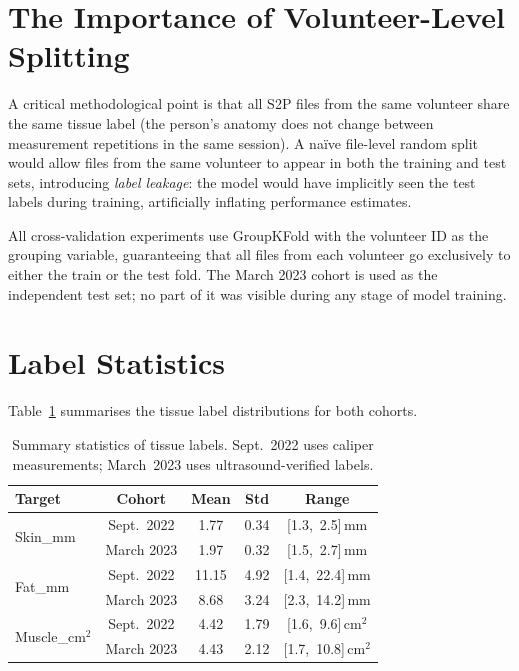 \documentclass[12pt, a4paper, oneside]{report}
\begin{document}
\section{The Importance of Volunteer-Level Splitting}

A critical methodological point is that all S2P files from the same volunteer share the same tissue label (the person's anatomy does not change between measurement repetitions in the same session). A na\"{i}ve file-level random split would allow files from the same volunteer to appear in both the training and test sets, introducing \emph{label leakage}: the model would have implicitly seen the test labels during training, artificially inflating performance estimates.

All cross-validation experiments use GroupKFold with the volunteer ID as the grouping variable, guaranteeing that all files from each volunteer go exclusively to either the train or the test fold. The March 2023 cohort is used as the independent test set; no part of it was visible during any stage of model training.

\section{Label Statistics}

Table~\ref{tab:label_stats} summarises the tissue label distributions for both cohorts.

\begin{table}[H]
  \centering
  \caption{Summary statistics of tissue labels. Sept.~2022 uses caliper measurements; March~2023 uses ultrasound-verified labels.}
  \label{tab:label_stats}
  \begin{tabular}{lcccc}
    \toprule
    \textbf{Target} & \textbf{Cohort} & \textbf{Mean} & \textbf{Std} & \textbf{Range} \\
    \midrule
    \multirow{2}{*}{Skin\_mm}      & Sept.\ 2022  & 1.77 & 0.34 & [1.3,\ 2.5]\,mm \\
                                    & March 2023   & 1.97 & 0.32 & [1.5,\ 2.7]\,mm \\
    \midrule
    \multirow{2}{*}{Fat\_mm}       & Sept.\ 2022  & 11.15 & 4.92 & [1.4,\ 22.4]\,mm \\
                                    & March 2023   & 8.68  & 3.24 & [2.3,\ 14.2]\,mm \\
    \midrule
    \multirow{2}{*}{Muscle\_cm$^2$}& Sept.\ 2022  & 4.42  & 1.79 & [1.6,\ 9.6]\,cm$^2$ \\
                                    & March 2023   & 4.43  & 2.12 & [1.7,\ 10.8]\,cm$^2$ \\
    \bottomrule
  \end{tabular}
\end{table}
\end{document}
